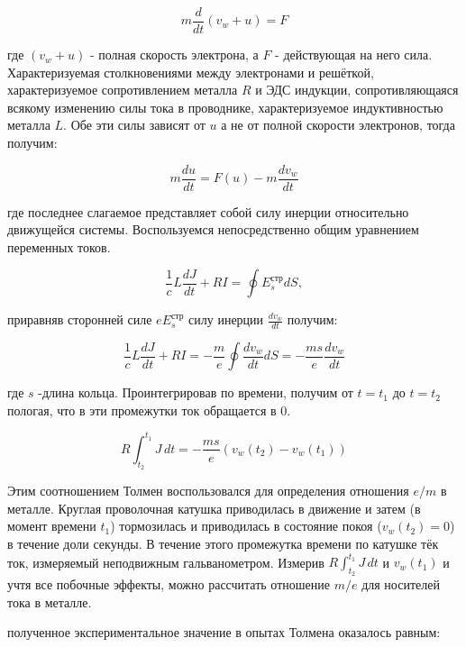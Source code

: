 \documentclass{lab}
\begin{document}
\begin{equation}
    m \frac{d}{dt} (v_{w} + u) = F
\end{equation}

где $(v_{w} + u)$ - полная скорость электрона, а $F$ - действующая на него сила. Характеризуемая столкновениями между электронами и решёткой, характеризуемое сопротивлением металла $R$ и ЭДС индукции, сопротивляющаяся всякому изменению силы тока в проводнике, характеризуемое индуктивностью металла $L$. Обе эти силы зависят от $u$ а не от полной скорости электронов, тогда получим:

\begin{equation}
    m \frac{du}{dt}  = F(u) - m \frac{dv_{w}}{dt}
\end{equation}

где последнее слагаемое представляет собой силу инерции относительно движущейся системы. Воспользуемся непосредственно общим уравнением переменных токов.

\begin{equation}
    \frac{1}{c}L\frac{dJ}{dt} +RI  = \oint{E^{\text{стр}}_{s}}dS,
\end{equation}

приравняв сторонней силе $ eE^{\text{стр}}_{s}$ силу инерции $\frac{dv_{w}}{dt}$ получим:

\begin{equation}
    \frac{1}{c}L\frac{dJ}{dt} +RI  = - \frac{m}{e} \oint{\frac{dv_{w}}{dt}}dS = - \frac{ms}{e} \frac{dv_{w}}{dt}
\end{equation}

где $s$ -длина кольца. Проинтегрировав по времени, получим от $t = t_1$ до $t = t_2$ пологая, что в эти промежутки ток обращается в 0.

\begin{equation}
    R\int_{t_2}^{t_1} J \,dt = - \frac{ms}{e} (v_{w}(t_2) - v_{w}(t_1))
\end{equation}

Этим соотношением Толмен воспользовался для определения отношения $e/m$ в металле. Круглая проволочная катушка приводилась в движение и затем (в момент времени $t_1$) тормозилась и приводилась в состояние покоя ($v_{w}(t_2) = 0$) в течение доли секунды. В течение этого промежутка времени по катушке тёк ток, измеряемый неподвижным гальванометром. Измерив $R\int_{t_2}^{t_1} J \,dt$ и $v_{w}(t_1)$ и учтя все побочные эффекты, можно рассчитать отношение $m/e$ для носителей тока в металле.

полученное экспериментальное значение в опытах Толмена оказалось равным:
\end{document}
